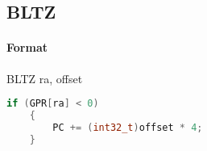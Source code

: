 \subsection{BLTZ}


\paragraph{Format} BLTZ ra, offset

\begin{lstlisting}[language=c]
    if (GPR[ra] < 0)
    {
        PC += (int32_t)offset * 4;
    }
\end{lstlisting}

